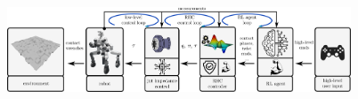 \begin{columns}[t]

	\hskip9cm\includegraphics[width=0.8\textwidth]{docs/imgs/approach.png}

	
	\begin{Large}
	
	\begin{column}{0.5\textwidth}

		\vspace{10cm}

	\end{column}

	\begin{column}{0.5\textwidth}

		\vspace{10cm}
		
	\end{column}
	\end{Large}
\end{columns}